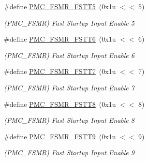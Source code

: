 \begin{DoxyCompactItemize}
\#define \mbox{\hyperlink{group__SAMS70__PMC_ga9bac35f07a6ff0faaf033f61b161f936}{P\+M\+C\+\_\+\+F\+S\+M\+R\+\_\+\+F\+S\+T\+T5}}~(0x1u $<$$<$ 5)
\begin{DoxyCompactList}\small\item\em (P\+M\+C\+\_\+\+F\+S\+MR) Fast Startup Input Enable 5 \end{DoxyCompactList}\item 
\mbox{\label{group__SAMS70__PMC_ga3b6da1895ec35cc9df97901ed644ecdb}} 
\#define \mbox{\hyperlink{group__SAMS70__PMC_ga3b6da1895ec35cc9df97901ed644ecdb}{P\+M\+C\+\_\+\+F\+S\+M\+R\+\_\+\+F\+S\+T\+T6}}~(0x1u $<$$<$ 6)
\begin{DoxyCompactList}\small\item\em (P\+M\+C\+\_\+\+F\+S\+MR) Fast Startup Input Enable 6 \end{DoxyCompactList}\item 
\mbox{\label{group__SAMS70__PMC_gaf4ff7e1da5eae4aac4516b218b6c82b3}} 
\#define \mbox{\hyperlink{group__SAMS70__PMC_gaf4ff7e1da5eae4aac4516b218b6c82b3}{P\+M\+C\+\_\+\+F\+S\+M\+R\+\_\+\+F\+S\+T\+T7}}~(0x1u $<$$<$ 7)
\begin{DoxyCompactList}\small\item\em (P\+M\+C\+\_\+\+F\+S\+MR) Fast Startup Input Enable 7 \end{DoxyCompactList}\item 
\mbox{\label{group__SAMS70__PMC_ga3fd561c6fba11d73551dafa5258d3f9a}} 
\#define \mbox{\hyperlink{group__SAMS70__PMC_ga3fd561c6fba11d73551dafa5258d3f9a}{P\+M\+C\+\_\+\+F\+S\+M\+R\+\_\+\+F\+S\+T\+T8}}~(0x1u $<$$<$ 8)
\begin{DoxyCompactList}\small\item\em (P\+M\+C\+\_\+\+F\+S\+MR) Fast Startup Input Enable 8 \end{DoxyCompactList}\item 
\mbox{\label{group__SAMS70__PMC_ga2257ec0dcad9ff51bda665ecbb7aea49}} 
\#define \mbox{\hyperlink{group__SAMS70__PMC_ga2257ec0dcad9ff51bda665ecbb7aea49}{P\+M\+C\+\_\+\+F\+S\+M\+R\+\_\+\+F\+S\+T\+T9}}~(0x1u $<$$<$ 9)
\begin{DoxyCompactList}\small\item\em (P\+M\+C\+\_\+\+F\+S\+MR) Fast Startup Input Enable 9 \end{DoxyCompactList}\item 
$$
\end{DoxyCompactItemize}
